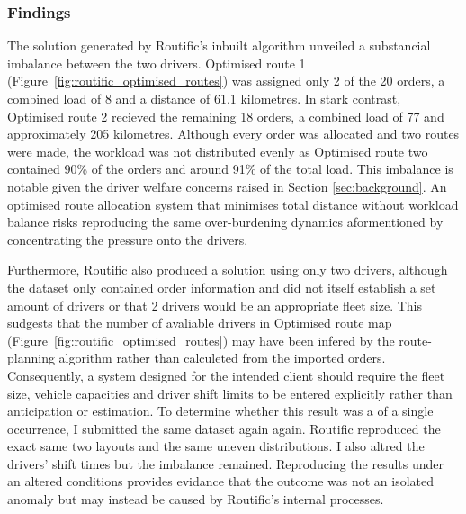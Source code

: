 \documentclass[11pt]{article}
\begin{document}
\subsubsection{Findings}
The solution generated by Routific's inbuilt algorithm unveiled a substancial imbalance between the two drivers. Optimised route 1 (Figure~\ref{fig:routific_optimised_routes}) was assigned only 2 of the 20 orders, a combined load of 8 and a distance of 61.1 kilometres. In stark contrast, Optimised route 2 recieved the remaining 18 orders, a combined load of 77 and approximately 205 kilometres. Although every order was allocated and two routes were made, the workload was not distributed evenly as Optimised route two contained 90\% of the orders and around 91\% of the total load. This imbalance is notable given the driver welfare concerns raised in Section \ref{sec:background}. An optimised route allocation system that minimises total distance without workload balance risks reproducing the same over-burdening dynamics aformentioned by concentrating the pressure onto the drivers. 

Furthermore, Routific also produced a solution using only two drivers, although the dataset only contained order information and did not itself establish a set amount of drivers or that 2 drivers would be an appropriate fleet size. This sudgests that the number of avaliable drivers in Optimised route map (Figure~\ref{fig:routific_optimised_routes}) may have been infered by the route-planning algorithm rather than calculeted from the imported orders. Consequently, a system designed for the intended client should require the fleet size, vehicle capacities and driver shift limits to be entered explicitly rather than anticipation or estimation. To determine whether this result was a of a single occurrence, I submitted the same dataset again again. Routific reproduced the exact same two layouts and the same uneven distributions. I also altred the drivers' shift times but the imbalance remained. Reproducing the results under an altered conditions provides evidance that the outcome was not an isolated anomaly but may instead be caused by Routific's internal processes. 
\end{document}
